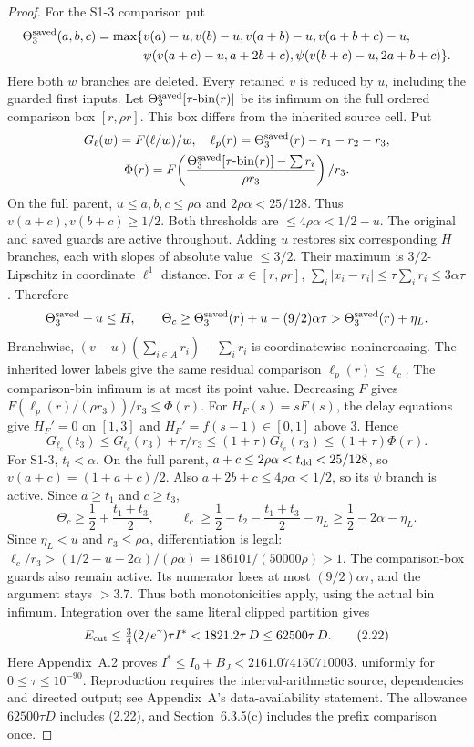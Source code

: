 \begin{proof}
For the S1-3 comparison put
\[
\begin{aligned}
\Theta_3^{\rm saved}(a,b,c)=\max\{&v(a)-u,v(b)-u,v(a+b)-u,v(a+b+c)-u,\\
 &\psi(v(a+c)-u,a+2b+c),\psi(v(b+c)-u,2a+b+c)\}.
\end{aligned}
\]
\hypertarget{p2:def:six-branch-saved}{}
Here both $w$ branches are deleted.
Every retained $v$ is reduced by $u$, including the guarded first inputs.
Let $\Theta_3^{\rm saved}[\tau\text{-bin}(r)]$ be its infimum
on the full ordered comparison box $[r,\rho r]$.
This box differs from the inherited source cell. Put
\[
\begin{gathered}
 G_\ell(w)=F(\ell/w)/w,\quad
 \ell_p(r)=\Theta_3^{\rm saved}(r)-r_1-r_2-r_3,\\
 \Phi(r)=F\!\left(\frac{\Theta_3^{\rm saved}[\tau\text{-bin}(r)]-\sum r_i}
 {\rho r_3}\right)/r_3.
\end{gathered}
\]
On the full parent, $u\le a,b,c\le\rho\alpha$ and $2\rho\alpha<25/128$.
Thus $v(a+c),v(b+c)\ge1/2$.
Both thresholds are $\le4\rho\alpha<1/2-u$.
The original and saved guards are active throughout.
Adding $u$ restores six corresponding $H$ branches,
each with slopes of absolute value $\le3/2$.
Their maximum is $3/2$-Lipschitz in coordinate $\ell^1$ distance.
For $x\in[r,\rho r]$, $\sum_i|x_i-r_i|\le\tau\sum_i r_i\le3\alpha\tau$.
Therefore
\[
 \Theta_3^{\rm saved}+u\le H,\qquad
 \Theta_c\ge\Theta_3^{\rm saved}(r)+u-(9/2)\alpha\tau
              >\Theta_3^{\rm saved}(r)+\eta_L.
\]
Branchwise, $(v-u)(\sum_{i\in A}r_i)-\sum_i r_i$ is coordinatewise nonincreasing.
The inherited lower labels give the same residual comparison $\ell_p(r)\le\ell_c$.
The comparison-bin infimum is at most its point value.
Decreasing $F$ gives $F(\ell_p(r)/(\rho r_3))/r_3\le\Phi(r)$.
For $H_F(s)=sF(s)$, the delay equations give
$H_F'=0$ on $[1,3]$ and $H_F'=f(s-1)\in[0,1]$ above $3$.
Hence
\[
 G_{\ell_c}(t_3)\le G_{\ell_c}(r_3)+\tau/r_3
 \le(1+\tau)G_{\ell_c}(r_3)\le(1+\tau)\Phi(r).
 \tag{2.21}\label{p2:eq:2.21}
\]
For S1-3, $t_i<\alpha$.
On the full parent, $a+c\le2\rho\alpha<t_{\rm dd}<25/128$,
so $v(a+c)=(1+a+c)/2$.
Also $a+2b+c\le4\rho\alpha<1/2$, so its $\psi$ branch is active.
Since $a\ge t_1$ and $c\ge t_3$,
\[
 \Theta_c\ge\frac12+\frac{t_1+t_3}{2},\qquad
 \ell_c\ge\frac12-t_2-\frac{t_1+t_3}{2}-\eta_L
             \ge\frac12-2\alpha-\eta_L.
\]
Since $\eta_L<u$ and $r_3\le\rho\alpha$,
differentiation is legal:
$\ell_c/r_3>(1/2-u-2\alpha)/(\rho\alpha)=186101/(50000\rho)>1$.
The comparison-box guards also remain active.
Its numerator loses at most $(9/2)\alpha\tau$, and the argument stays $>3.7$.
Thus both monotonicities apply, using the actual bin infimum.
Integration over the same literal clipped partition gives
\[
 E_{\rm cut}\le\tfrac34(2/e^\gamma)\tau I^*<1821.2\tau\,D
 \le62500\tau\,D.
 \tag{2.22}\label{p2:eq:2.22}
\]
Here Appendix~A.2 proves $I^*\le I_0+B_J<2161.074150710003$,
uniformly for $0\le\tau\le10^{-90}$.
Reproduction requires the interval-arithmetic source, dependencies and directed output;
see Appendix~A's data-availability statement.
The allowance $62500\tau D$ includes (2.22),
and Section~6.3.5(c) includes the prefix comparison once.


\end{proof}
